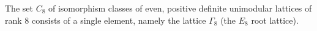 The set $C_8$ of isomorphism classes of even, positive definite unimodular lattices of rank $8$ consists of a single element, namely the lattice $\Gamma_8$ (the $E_8$ root lattice).
